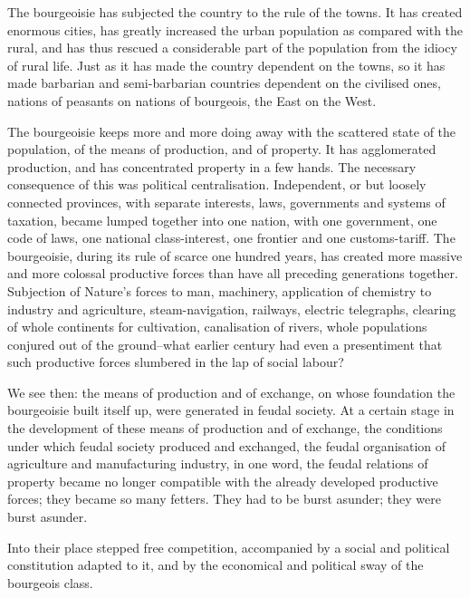 \documentclass[11pt]{book}
\begin{document}
The bourgeoisie has subjected the country to the rule of the
towns.  It has created enormous cities, has greatly increased the
urban population as compared with the rural, and has thus rescued
a considerable part of the population from the idiocy of rural
life.  Just as it has made the country dependent on the towns, so
it has made barbarian and semi-barbarian countries dependent on
the civilised ones, nations of peasants on nations of bourgeois,
the East on the West.

The bourgeoisie keeps more and more doing away with the
scattered state of the population, of the means of production,
and of property.  It has agglomerated production, and has
concentrated property in a few hands.  The necessary consequence
of this was political centralisation.  Independent, or but
loosely connected provinces, with separate interests, laws,
governments and systems of taxation, became lumped together into
one nation, with one government, one code of laws, one national
class-interest, one frontier and one customs-tariff.  The
bourgeoisie, during its rule of scarce one hundred years, has
created more massive and more colossal productive forces than
have all preceding generations together.  Subjection of Nature's
forces to man, machinery, application of chemistry to industry
and agriculture, steam-navigation, railways, electric telegraphs,
clearing of whole continents for cultivation, canalisation of
rivers, whole populations conjured out of the ground--what
earlier century had even a presentiment that such productive
forces slumbered in the lap of social labour?

We see then: the means of production and of exchange, on whose
foundation the bourgeoisie built itself up, were generated in
feudal society.  At a certain stage in the development of these
means of production and of exchange, the conditions under which
feudal society produced and exchanged, the feudal organisation of
agriculture and manufacturing industry, in one word, the feudal
relations of property became no longer compatible with the
already developed productive forces; they became so many fetters.
They had to be burst asunder; they were burst asunder.

Into their place stepped free competition, accompanied by a
social and political constitution adapted to it, and by the
economical and political sway of the bourgeois class.
\end{document}
